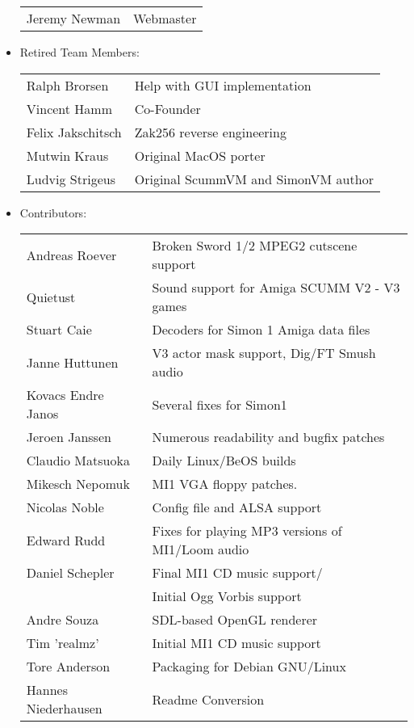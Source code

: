 \begin{itemize}
\begin{tabular}[h]{p{4cm}l}
    Jeremy Newman        & Webmaster\\
  \end{tabular}
\item Retired Team Members:\\
  \begin{tabular}[h]{p{4cm}l}
    Ralph Brorsen        & Help with GUI implementation\\
    Vincent Hamm         & Co-Founder\\
    Felix Jakschitsch    & Zak256 reverse engineering\\
    Mutwin Kraus         & Original MacOS porter\\
    Ludvig Strigeus      & Original ScummVM and SimonVM author\\
  \end{tabular}
\item Contributors:\\
  \begin{tabular}{p{4cm}l}
    Andreas Roever       & Broken Sword 1/2 MPEG2 cutscene support\\
    Quietust             & Sound support for Amiga SCUMM V2 - V3 games\\
    Stuart Caie          & Decoders for Simon 1 Amiga data files\\
    Janne Huttunen       & V3 actor mask support, Dig/FT Smush audio\\
    Kovacs Endre Janos   & Several fixes for Simon1\\
    Jeroen Janssen       & Numerous readability and bugfix patches\\
    Claudio Matsuoka     & Daily Linux/BeOS builds \\
    Mikesch Nepomuk      & MI1 VGA floppy patches.\\
    Nicolas Noble        & Config file and ALSA support\\
    Edward Rudd          & Fixes for playing MP3 versions of MI1/Loom audio\\
    Daniel Schepler      & Final MI1 CD music support/\\
                         & Initial Ogg Vorbis support\\
    Andre Souza          & SDL-based OpenGL renderer\\
    Tim 'realmz'         & Initial MI1 CD music support\\
    Tore Anderson        & Packaging for Debian GNU/Linux\\
    Hannes Niederhausen  & Readme Conversion\\
  \end{tabular}
  

\end{itemize}
